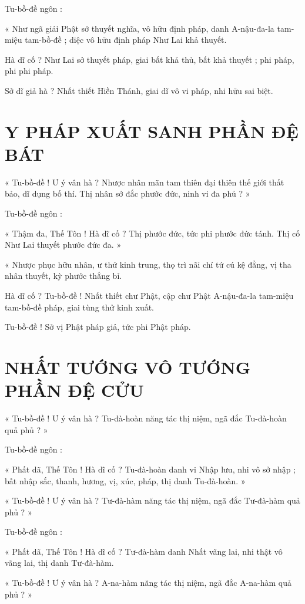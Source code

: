 	Tu-bồ-đề ngôn :
	
	« Như ngã giải Phật sở thuyết nghĩa, vô hữu định pháp, danh A-nậu-đa-la tam-miệu tam-bồ-đề ; diệc vô hữu định pháp Như Lai khả thuyết. 
	
	Hà dĩ cố ? Như Lai sở thuyết pháp, giai bất khả thủ, bất khả thuyết ; phi pháp, phi phi pháp. 
	
	Sở dĩ giả hà ? Nhất thiết Hiền Thánh, giai dĩ vô vi pháp, nhi hữu sai biệt.
	
	\section*{Y PHÁP XUẤT SANH PHẦN ĐỆ BÁT}
	
	« Tu-bồ-đề ! Ư ý vân hà ? Nhược nhân mãn tam thiên đại thiên thế giới thất bảo, dĩ dụng bố thí. Thị nhân sở đắc phước đức, ninh vi đa phủ ? »
	
	Tu-bồ-đề ngôn : 
	
	« Thậm đa, Thế Tôn ! Hà dĩ cố ? Thị phước đức, tức phi phước đức tánh. Thị cố Như Lai thuyết phước đức đa. »
	
	« Nhược phục hữu nhân, ư thử kinh trung, thọ trì nãi chí tứ cú kệ đẳng, vị tha nhân thuyết, kỳ phước thắng bỉ. 
	
	Hà dĩ cố ? Tu-bồ-đề ! Nhất thiết chư Phật, cập chư Phật A-nậu-đa-la tam-miệu tam-bồ-đề pháp, giai tùng thử kinh xuất. 
	
	Tu-bồ-đề ! Sở vị Phật pháp giả, tức phi Phật pháp.
	
	\section*{NHẤT TƯỚNG VÔ TƯỚNG PHẦN ĐỆ CỬU}
	
	« Tu-bồ-đề ! Ư ý vân hà ? Tu-đà-hoàn năng tác thị niệm, ngã đắc Tu-đà-hoàn quả phủ ? »
	
	Tu-bồ-đề ngôn :
	
	« Phất dã, Thế Tôn ! Hà dĩ cố ? Tu-đà-hoàn danh vi Nhập lưu, nhi vô sở nhập ; bất nhập sắc, thanh, hương, vị, xúc, pháp, thị danh Tu-đà-hoàn. »
	
	« Tu-bồ-đề ! Ư ý vân hà ? Tư-đà-hàm năng tác thị niệm, ngã đắc Tư-đà-hàm quả phủ ? »
	
	Tu-bồ-đề ngôn :
	
	« Phất dã, Thế Tôn ! Hà dĩ cố ? Tư-đà-hàm danh Nhất vãng lai, nhi thật vô vãng lai, thị danh Tư-đà-hàm.
	
	« Tu-bồ-đề ! Ư ý vân hà ? A-na-hàm năng tác thị niệm, ngã đắc A-na-hàm quả phủ ? »
	
